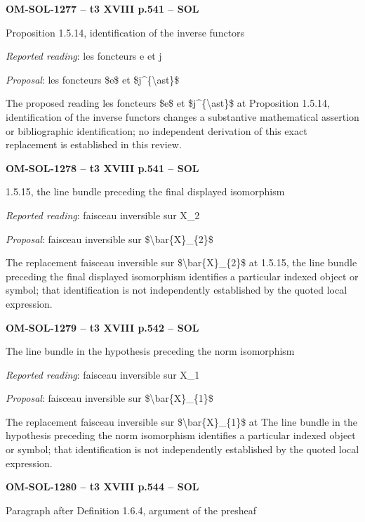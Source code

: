 \par\noindent\textbf{OM-SOL-1277 -- t3 XVIII p.541 -- SOL}\par
Proposition 1.5.14, identification of the inverse functors\par
\emph{Reported reading}: les foncteurs e et j\par
\emph{Proposal}: les foncteurs \$e\$ et \$j\textasciicircum{}\{\textbackslash{}ast\}\$\par
The proposed reading les foncteurs \$e\$ et \$j\textasciicircum{}\{\textbackslash{}ast\}\$ at Proposition 1.5.14, identification of the inverse functors changes a substantive mathematical assertion or bibliographic identification; no independent derivation of this exact replacement is established in this review.\par
\par\noindent\textbf{OM-SOL-1278 -- t3 XVIII p.541 -- SOL}\par
1.5.15, the line bundle preceding the final displayed isomorphism\par
\emph{Reported reading}: faisceau inversible sur X\_2\par
\emph{Proposal}: faisceau inversible sur \$\textbackslash{}bar\{X\}\_\{2\}\$\par
The replacement faisceau inversible sur \$\textbackslash{}bar\{X\}\_\{2\}\$ at 1.5.15, the line bundle preceding the final displayed isomorphism identifies a particular indexed object or symbol; that identification is not independently established by the quoted local expression.\par
\par\noindent\textbf{OM-SOL-1279 -- t3 XVIII p.542 -- SOL}\par
The line bundle in the hypothesis preceding the norm isomorphism\par
\emph{Reported reading}: faisceau inversible sur X\_1\par
\emph{Proposal}: faisceau inversible sur \$\textbackslash{}bar\{X\}\_\{1\}\$\par
The replacement faisceau inversible sur \$\textbackslash{}bar\{X\}\_\{1\}\$ at The line bundle in the hypothesis preceding the norm isomorphism identifies a particular indexed object or symbol; that identification is not independently established by the quoted local expression.\par
\par\noindent\textbf{OM-SOL-1280 -- t3 XVIII p.544 -- SOL}\par
Paragraph after Definition 1.6.4, argument of the presheaf\par
